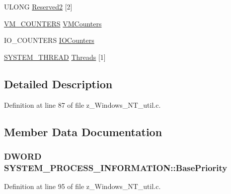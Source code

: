\begin{DoxyCompactItemize}
\item 
U\-L\-O\-N\-G \hyperlink{structSYSTEM__PROCESS__INFORMATION_a67112545756523aca97cbd85d7b21789}{Reserved2} \mbox{[}2\mbox{]}
\item 
\hyperlink{structVM__COUNTERS}{V\-M\-\_\-\-C\-O\-U\-N\-T\-E\-R\-S} \hyperlink{structSYSTEM__PROCESS__INFORMATION_af3f683c905e1f64f14f903903943b488}{V\-M\-Counters}
\item 
I\-O\-\_\-\-C\-O\-U\-N\-T\-E\-R\-S \hyperlink{structSYSTEM__PROCESS__INFORMATION_a937f735ee919ae380aab5eecf62df9d4}{I\-O\-Counters}
\item 
\hyperlink{structSYSTEM__THREAD}{S\-Y\-S\-T\-E\-M\-\_\-\-T\-H\-R\-E\-A\-D} \hyperlink{structSYSTEM__PROCESS__INFORMATION_aac3fdc1ec643d605e0d072f9ac39fe5f}{Threads} \mbox{[}1\mbox{]}
\end{DoxyCompactItemize}


\subsection{Detailed Description}


Definition at line 87 of file z\-\_\-\-Windows\-\_\-\-N\-T\-\_\-util.\-c.



\subsection{Member Data Documentation}
\hypertarget{structSYSTEM__PROCESS__INFORMATION_a1e17428ae6e3cf412506c78188ebdd64}{
\subsubsection[{Base\-Priority}]{\setlength{\rightskip}{0pt plus 5cm}D\-W\-O\-R\-D S\-Y\-S\-T\-E\-M\-\_\-\-P\-R\-O\-C\-E\-S\-S\-\_\-\-I\-N\-F\-O\-R\-M\-A\-T\-I\-O\-N\-::\-Base\-Priority}}\label{structSYSTEM__PROCESS__INFORMATION_a1e17428ae6e3cf412506c78188ebdd64}


Definition at line 95 of file z\-\_\-\-Windows\-\_\-\-N\-T\-\_\-util.\-c.

